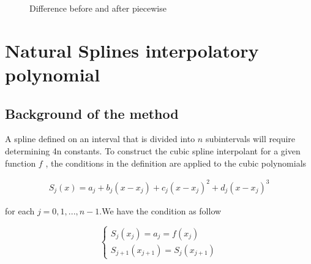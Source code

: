 \documentclass{article}
\begin{document}
\begin{figure}[htbp]
\centering
{}
\quad
\quad
{}
\caption{Difference before and after piecewise}
\end{figure}


\section{Natural Splines interpolatory polynomial}
\subsection{Background of the method}
A spline defined on an interval that is divided into $n$
subintervals will require determining 4n constants. To construct the cubic spline interpolant
for a given function $f$ , the conditions in the definition are applied to the cubic polynomials

\begin{align}
S_{j}(x) = a_j + b_{j}(x - x_j) + c_{j}(x - x_j)^2 + d_{j}(x - x_j)^3\nonumber
\label{taylor1}
\end{align}

for each $j = 0, 1,..., n - 1$.We have the condition as follow

\begin{equation}
    \begin{cases}
        S_{j}(x_j) = a_j = f (x_j) \\
        S_{j+1}(x_{j+1}) = S_{j}(x_{j+1})
     \end{cases}
\end{equation}
\end{document}
